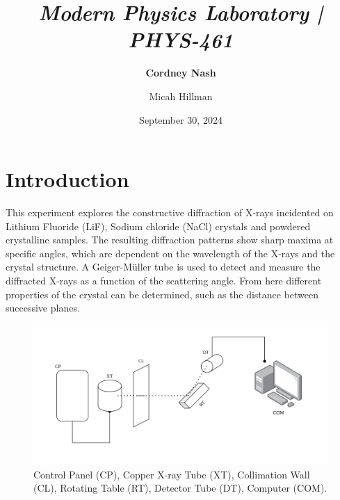 \documentclass[a4paper,12pt,english]{all-in-one} %
\title{{\large\textit{Modern Physics Laboratory | PHYS-461}}\\[0.5cm]{\Huge\color{gray}\textsc{\@docsubtitle}}}
\author{\textbf{Cordney Nash}  \and Micah Hillman  }
\date{September 30, 2024}
\newcommand\tab[1][1cm]{\hspace*{#1}}
\begin{document}
\begin{titlepage}
\maketitle\vfill
\end{titlepage}
\newpage


\section*{Introduction}
{
\tab This experiment explores the constructive diffraction of X-rays incidented on Lithium Fluoride (LiF), Sodium chloride (NaCl) crystals and powdered crystalline samples. The resulting diffraction patterns show sharp maxima at specific angles, which are dependent on the wavelength of the X-rays and the crystal structure. A Geiger-Müller tube is used to detect and measure the diffracted X-rays as a function of the scattering angle. From here different properties of the crystal can be determined, such as the distance between successive planes.
}

\begin{figure}[h!]
    \centering
    \includegraphics[width=0.8\linewidth]{3-xray/overleaf/Images/xray_diagram.png}
    \caption{ \scriptsize{ Control Panel (CP), Copper X-ray Tube (XT), Collimation Wall (CL), Rotating Table (RT), Detector Tube (DT), Computer (COM).
    } }
    \label{fig:enter-label}
\end{figure}
\end{document}
